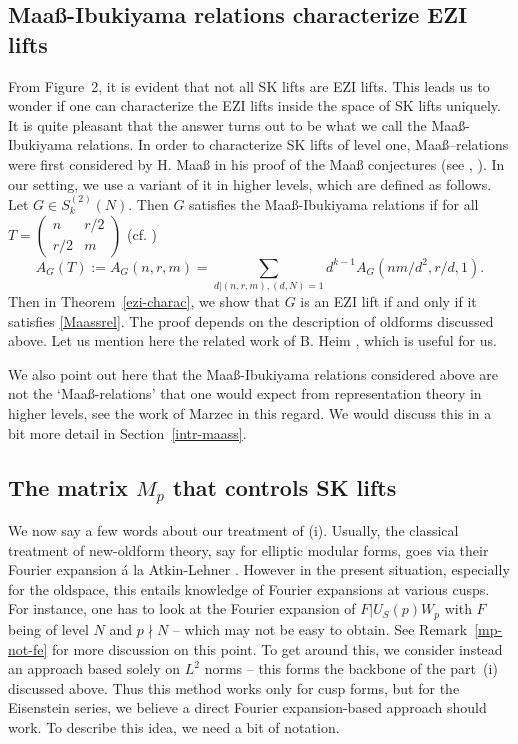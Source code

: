 \documentclass[11pt]{amsart}
\numberwithin{equation}{section}
\theoremstyle{plain}
\theoremstyle{definition}
\newcommand{\thmref}[1]{Theorem~\ref{#1}}
\newcommand{\rmkref}[1]{Remark~\ref{#1}}
\newcommand{\psmb}{\left( \begin{smallmatrix}}
\newcommand{\psme}{ \end{smallmatrix} \right) }
\newcommand{\stwon}{S^{(2)}_k(N)}
\begin{document}
\subsection{Maa{\ss}-Ibukiyama relations characterize EZI lifts}
From Figure~2, it is evident that not all SK lifts are EZI lifts. This leads us to wonder if one can characterize the EZI lifts inside the space of SK lifts uniquely. It is quite pleasant that the answer turns out to be what we call the Maa{\ss}-Ibukiyama relations. In order to characterize SK lifts of level one, Maa{\ss}--relations were first considered by H. Maa{\ss} in his proof of the Maa{\ss} conjectures (see \cite{maass1978lineare}, \cite{maass1}). In our setting, we use a variant of it in higher levels, which are defined as follows. Let $G \in \stwon$. Then $G$ satisfies the Maa{\ss}-Ibukiyama relations if for all $T= \psmb n & r/2 \\ r/2 & m \psme$ (cf. \cite[\S 3.4]{Ibu-SK})
\begin{equation}\label{Maassrel}
       A_G(T):= A_G(n,r,m)= \sum_{d|(n,r,m), (d,N)=1} d^{k-1} A_G(nm/d^2, r/d,1).
    \end{equation}
Then in \thmref{ezi-charac}, we show that $G$ is an EZI lift if and only if it satisfies \eqref{Maassrel}. The proof depends on the description of oldforms discussed above. Let us mention here the related work of B. Heim \cite{heim2017maass}, which is useful for us. 

We also point out here that the Maa{\ss}-Ibukiyama relations considered above are not the `Maa{\ss}-relations' that one would expect from representation theory in higher levels, see the work of Marzec  \cite{marzec2021maass} in this regard. We would discuss this in a bit more detail in Section~\ref{intr-maass}.

\subsection{\texorpdfstring{The matrix $M_p$ that controls SK lifts}{The matrix Mp that controls SK lifts}}\label{Mpintro}
We now say a few words about our treatment of (i). Usually, the classical treatment of new-oldform theory, say for elliptic modular forms, goes via their Fourier expansion \'a la Atkin-Lehner \cite{AL}. However in the present situation, especially for the oldspace, this entails knowledge of Fourier expansions at various cusps. For instance, one has to look at the Fourier expansion of $F| U_S(p)W_p$ with $F$ being of level $N$ and $p \nmid N$ -- which may not be easy to obtain. See \rmkref{mp-not-fe} for more discussion on this point. To get around this, we consider instead an approach based solely on $L^2$ norms -- this forms the backbone of the part~(i) discussed above. Thus this method works only for cusp forms, but for the Eisenstein series, we believe a direct Fourier expansion-based approach should work. To describe this idea, we need a bit of notation.
\end{document}
